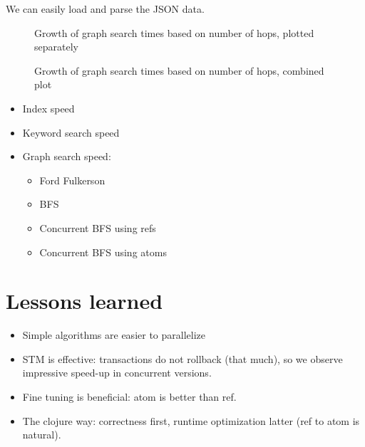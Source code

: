 				We can easily load and parse the JSON data.
				
				\begin{figure}[!ht]
					\centering
					
					
					\caption{Growth of graph search times based on number of hops, plotted separately}
					\label{fig:methods-subplots}
				\end{figure}
				
				\begin{figure}[!ht]
					\centering
					
					
					\caption{Growth of graph search times based on number of hops, combined plot}
					\label{fig:methods-compared}
				\end{figure}
		
		\begin{itemize}
			\item Index speed
			\item Keyword search speed
			\item Graph search speed:
				\begin{itemize}
					\item Ford Fulkerson
					\item BFS
					\item Concurrent BFS using refs
					\item Concurrent BFS using atoms
				\end{itemize}
		\end{itemize}
	
	\section{Lessons learned}
		\begin{itemize}
			\item Simple algorithms are easier to parallelize
			\item STM is effective: transactions do not rollback (that much), so we observe impressive speed-up in concurrent versions.
			\item Fine tuning is beneficial: atom is better than ref.
			\item The clojure way: correctness first, runtime optimization latter (ref to atom is natural).
		\end{itemize}